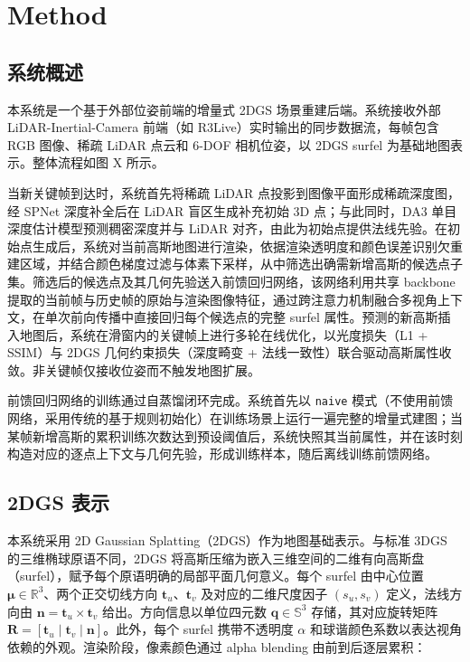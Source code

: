 
\section{Method}

\subsection{系统概述}

本系统是一个基于外部位姿前端的增量式 2DGS 场景重建后端。系统接收外部 LiDAR-Inertial-Camera 前端（如 R3Live）实时输出的同步数据流，每帧包含 RGB 图像、稀疏 LiDAR 点云和 6-DOF 相机位姿，以 2DGS surfel 为基础地图表示。整体流程如图 X 所示。

当新关键帧到达时，系统首先将稀疏 LiDAR 点投影到图像平面形成稀疏深度图，经 SPNet 深度补全后在 LiDAR 盲区生成补充初始 3D 点；与此同时，DA3 单目深度估计模型预测稠密深度并与 LiDAR 对齐，由此为初始点提供法线先验。在初始点生成后，系统对当前高斯地图进行渲染，依据渲染透明度和颜色误差识别欠重建区域，并结合颜色梯度过滤与体素下采样，从中筛选出确需新增高斯的候选点子集。筛选后的候选点及其几何先验送入前馈回归网络，该网络利用共享 backbone 提取的当前帧与历史帧的原始与渲染图像特征，通过跨注意力机制融合多视角上下文，在单次前向传播中直接回归每个候选点的完整 surfel 属性。预测的新高斯插入地图后，系统在滑窗内的关键帧上进行多轮在线优化，以光度损失（L1 + SSIM）与 2DGS 几何约束损失（深度畸变 + 法线一致性）联合驱动高斯属性收敛。非关键帧仅接收位姿而不触发地图扩展。

前馈回归网络的训练通过自蒸馏闭环完成。系统首先以 \texttt{naive} 模式（不使用前馈网络，采用传统的基于规则初始化）在训练场景上运行一遍完整的增量式建图；当某帧新增高斯的累积训练次数达到预设阈值后，系统快照其当前属性，并在该时刻构造对应的逐点上下文与几何先验，形成训练样本，随后离线训练前馈网络。

\subsection{2DGS 表示}

本系统采用 2D Gaussian Splatting（2DGS）作为地图基础表示。与标准 3DGS 的三维椭球原语不同，2DGS 将高斯压缩为嵌入三维空间的二维有向高斯盘（surfel），赋予每个原语明确的局部平面几何意义。每个 surfel 由中心位置 $\boldsymbol{\mu} \in \mathbb{R}^3$、两个正交切线方向 $\mathbf{t}_u$、$\mathbf{t}_v$ 及对应的二维尺度因子 $(s_u, s_v)$ 定义，法线方向由 $\mathbf{n} = \mathbf{t}_u \times \mathbf{t}_v$ 给出。方向信息以单位四元数 $\mathbf{q} \in \mathbb{S}^3$ 存储，其对应旋转矩阵 $\mathbf{R} = [\mathbf{t}_u \mid \mathbf{t}_v \mid \mathbf{n}]$。此外，每个 surfel 携带不透明度 $\alpha$ 和球谐颜色系数以表达视角依赖的外观。渲染阶段，像素颜色通过 alpha blending 由前到后逐层累积：


